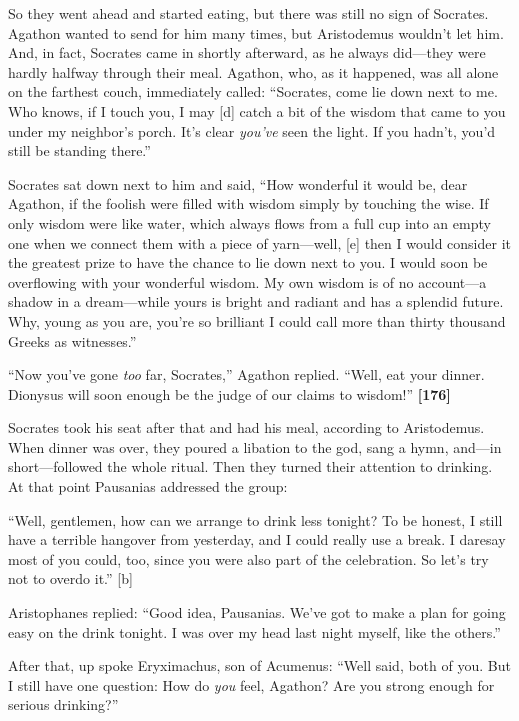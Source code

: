 So they went ahead and started eating, but there was still no sign of
Socrates. Agathon wanted to send for him many times, but Aristodemus
wouldn't let him. And, in fact, Socrates came in shortly afterward, as
he always did---they were hardly halfway through their meal. Agathon,
who, as it happened, was all alone on the farthest couch, immediately
called: “Socrates, come lie down next to me. Who knows, if I touch you,
I may {[}d{]} catch a bit of the wisdom that came to you under my
neighbor's porch. It's clear {\em you've} seen the light. If you hadn't,
you'd still be standing there.”

Socrates sat down next to him and said, “How wonderful it would be, dear
Agathon, if the foolish were filled with wisdom simply by touching the
wise. If only wisdom were like water, which always flows from a full cup
into an empty one when we connect them with a piece of yarn---well,
{[}e{]} then I would consider it the greatest prize to have the chance
to lie down next to you. I would soon be overflowing with your wonderful
wisdom. My own wisdom is of no account---a shadow in a dream---while
yours is bright and radiant and has a splendid future. Why, young as you
are, you're so brilliant I could call more than thirty thousand Greeks
as witnesses.”

“Now you've gone {\em too} far, Socrates,” Agathon replied. “Well, eat
your dinner. Dionysus will soon enough be the judge of our claims to
wisdom!”
{\bf {[}176{]}}

Socrates took his seat after that and had his meal, according to
Aristodemus. When dinner was over, they poured a libation to the god,
sang a hymn, and---in short---followed the whole ritual. Then they
turned their attention to drinking. At that point Pausanias addressed
the group:

“Well, gentlemen, how can we arrange to drink less tonight? To be
honest, I still have a terrible hangover from yesterday, and I could
really use a break. I daresay most of you could, too, since you were
also part of the celebration. So let's try not to overdo it.” {[}b{]}

Aristophanes replied: “Good idea, Pausanias. We've got to make a plan
for going easy on the drink tonight. I was over my head last night
myself, like the others.”

After that, up spoke Eryximachus, son of Acumenus: “Well said, both of
you. But I still have one question: How do {\em you} feel, Agathon? Are
you strong enough for serious drinking?”

